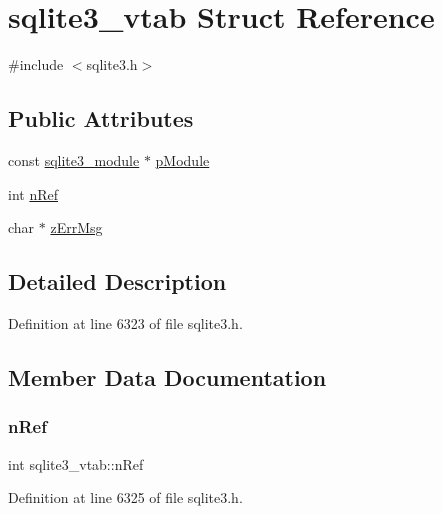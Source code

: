 \hypertarget{structsqlite3__vtab}{}\section{sqlite3\+\_\+vtab Struct Reference}
\label{structsqlite3__vtab}


{\ttfamily \#include $<$sqlite3.\+h$>$}

\subsection*{Public Attributes}
\begin{DoxyCompactItemize}
\item 
const \mbox{\hyperlink{structsqlite3__module}{sqlite3\+\_\+module}} $\ast$ \mbox{\hyperlink{structsqlite3__vtab_a4ef8198ca611b73a9b23054dd1e91e2b}{p\+Module}}
\item 
int \mbox{\hyperlink{structsqlite3__vtab_ab3c80d385849bdd82363a0df7d6fcba8}{n\+Ref}}
\item 
char $\ast$ \mbox{\hyperlink{structsqlite3__vtab_afc50eadfdd7cef876633d460deba48d6}{z\+Err\+Msg}}
\end{DoxyCompactItemize}


\subsection{Detailed Description}


Definition at line 6323 of file sqlite3.\+h.



\subsection{Member Data Documentation}
\mbox{\label{structsqlite3__vtab_ab3c80d385849bdd82363a0df7d6fcba8}} 
\subsubsection{\texorpdfstring{n\+Ref}{nRef}}
{\footnotesize\ttfamily int sqlite3\+\_\+vtab\+::n\+Ref}



Definition at line 6325 of file sqlite3.\+h.

\mbox{\label{structsqlite3__vtab_a4ef8198ca611b73a9b23054dd1e91e2b}} 
